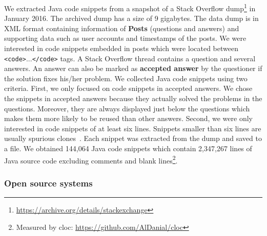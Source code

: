 \documentclass[sigconf,review, anonymous]{acmart}
\begin{document}
We extracted Java code snippets from a snapshot of a Stack Overflow
dump\footnote{\url{https://archive.org/details/stackexchange}} in
January 2016. The archived dump has a size of 9 gigabytes. The data
dump is in XML format containing information of \textbf{Posts}
(questions and answers) and supporting data such as user accounts and
timestamps of the posts. We were interested in code snippets embedded
in posts which were located between
{\small\texttt{<code>}...\texttt{</code>}} tags. A Stack Overflow
thread contains a question and several answers. An answer can also be
marked as \textbf{accepted answer} by the questioner if the solution
fixes his/her problem. We collected Java code snippets using two
criteria. First, we only focused on code snippets in accepted
answers. We chose the snippets in accepted answers because they
actually solved the problems in the questions. Moreover, they are
always displayed just below the questions which makes them more
likely to be reused than other answers. Second, we were only
interested in code snippets of at least six lines. Snippets smaller
than six lines are usually spurious clones~\cite{Bellon2007}. Each
snippet was extracted from the dump and saved to a file.
We obtained 144,064 Java code snippets which contain 2,347,267 lines
of Java source code excluding comments and blank
lines\footnote{Measured by cloc:
  \url{https://github.com/AlDanial/cloc}}.

\subsubsection{Open source systems}
\end{document}
